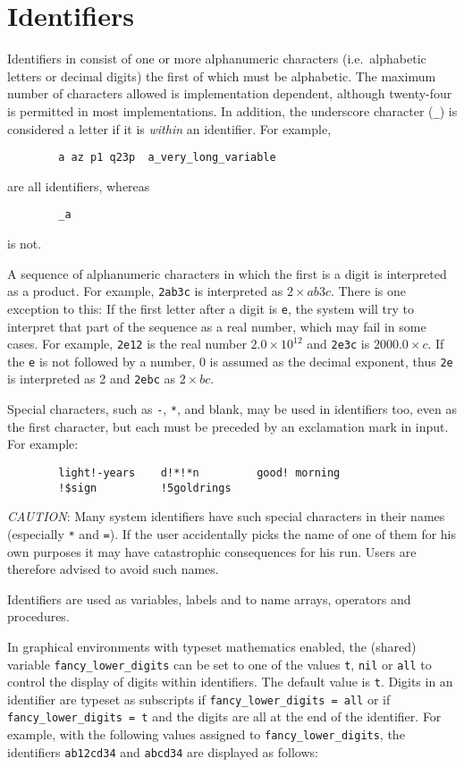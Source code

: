 \section{Identifiers}

Identifiers in {\REDUCE} consist of one or more
alphanumeric characters (i.e.\ alphabetic letters or decimal
digits) the first of which must be alphabetic.  The maximum number of
characters allowed is implementation dependent, although twenty-four is
permitted in most implementations.  In addition, the underscore character
(\texttt{\_}) is considered a letter if it is \emph{within} an identifier.
For example,
\begin{verbatim}
        a az p1 q23p  a_very_long_variable
\end{verbatim}
are all identifiers, whereas
\begin{verbatim}
        _a
\end{verbatim}
is not.

A sequence of alphanumeric characters in which the first is a digit is
interpreted as a product.  For example, \texttt{2ab3c} is interpreted as
$2 \times \mathit{ab3c}$.  There is one exception to this:  If the first letter after a
digit is \texttt{e}, the system will try to interpret that part of the
sequence as a real number, which may fail in some cases.  For
example, \texttt{2e12} is the real number $2.0 \times 10^{12}$ and \texttt{2e3c} is
$2000.0 \times c$. If the \texttt{e} is not followed by a number, 0 is assumed as the
decimal exponent, thus \texttt{2e} is interpreted as 2 and \texttt{2ebc} as
$2 \times \mathit{bc}$.

Special characters, such as \texttt{-}, \texttt{*}, and blank, may be
used in identifiers
too, even as the first character, but each must be preceded by an
exclamation mark in input.  For example:
\begin{verbatim}
        light!-years    d!*!*n         good! morning
        !$sign          !5goldrings
\end{verbatim}
\textit{CAUTION}: Many system identifiers have such special characters
in their names (especially \texttt{*} and \texttt{=}).  If the user
accidentally picks the name of one of them for his own purposes it may
have catastrophic consequences for his {\REDUCE} run.  Users are
therefore advised to avoid such names.

Identifiers are used as variables, labels and to name arrays, operators
and procedures.

In graphical environments with typeset mathematics enabled, the
(shared) variable
\texttt{fancy\_lower\_digits} can be set
to one of the values \texttt{t}, \texttt{nil} or \texttt{all} to
control the display of digits within identifiers.  The default value
is \texttt{t}.  Digits in an identifier are typeset as subscripts if
\texttt{fancy\_lower\_digits~=~all} or if
\texttt{fancy\_lower\_digits~=~t} and the digits are all at the end of
the identifier.  For example, with the following values assigned to
\texttt{fancy\_lower\_digits}, the identifiers \texttt{ab12cd34} and
\texttt{abcd34} are displayed as follows:

